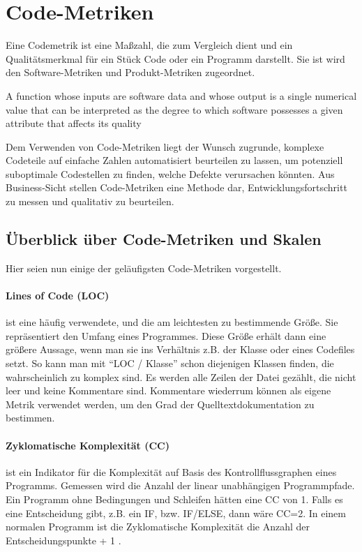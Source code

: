 \section{Code-Metriken}
Eine Codemetrik ist eine Maßzahl, die zum Vergleich dient und ein Qualitätsmerkmal für ein Stück Code oder ein Programm darstellt. Sie ist wird den Software-Metriken und Produkt-Metriken zugeordnet.

\epigraph{A function whose inputs are software data and whose output is a single
numerical value that can be interpreted as the degree to which software possesses a given attribute that affects its quality}{\cite{ieee_1998}}

Dem Verwenden von Code-Metriken liegt der Wunsch zugrunde, komplexe Codeteile auf einfache Zahlen automatisiert beurteilen zu lassen, um potenziell suboptimale Codestellen zu finden, welche Defekte verursachen könnten. Aus Business-Sicht stellen Code-Metriken eine Methode dar, Entwicklungsfortschritt zu messen und qualitativ zu beurteilen.
\subsection{Überblick über Code-Metriken und Skalen}
Hier seien nun einige der geläufigsten Code-Metriken vorgestellt.
\paragraph{Lines of Code (LOC)} ist eine häufig verwendete, und die am leichtesten zu bestimmende Größe. Sie repräsentiert den Umfang eines Programmes. Diese Größe erhält dann eine größere Aussage, wenn man sie ins Verhältnis z.B. der Klasse oder eines Codefiles setzt. So kann man mit "`LOC / Klasse"' schon diejenigen Klassen finden, die wahrscheinlich zu komplex sind. Es werden alle Zeilen der Datei gezählt, die nicht leer und keine Kommentare sind. Kommentare wiederrum können als eigene Metrik verwendet werden, um den Grad der Quelltextdokumentation zu bestimmen.

\paragraph{Zyklomatische Komplexität (CC)} ist ein Indikator für die Komplexität auf Basis des Kontrollflussgraphen eines Programms. Gemessen wird die Anzahl der linear unabhängigen Programmpfade. Ein Programm ohne Bedingungen und Schleifen hätten eine CC von 1. Falls es eine Entscheidung gibt, z.B. ein IF, bzw. IF/ELSE, dann wäre CC=2. In einem normalen Programm ist die Zyklomatische Komplexität die Anzahl der Entscheidungspunkte + 1 \citep[S. 314]{mccabe_complexity_1976}.


